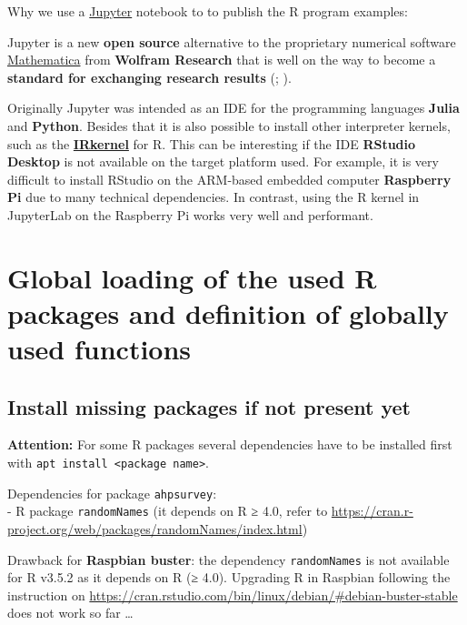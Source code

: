 \documentclass [oneside,10pt,a4paper,ngerman,BCOR10mm,headsepline,parindent,final]{scrartcl}
\begin{document}
Why we use a
\href{https://en.wikipedia.org/wiki/Project_Jupyter}{Jupyter} notebook
to to publish the R program examples:

Jupyter is a new \textbf{open source} alternative to the proprietary
numerical software
\href{https://en.wikipedia.org/wiki/Wolfram_Mathematica}{Mathematica}
from \textbf{Wolfram Research} that is well on the way to become a
\textbf{standard for exchanging research results}
(\cite{Scientific_Paper_obsolete_2018};
\cite{Future_of_Research_Paper_2018}).

Originally Jupyter was intended as an IDE for the programming languages
\textbf{Julia} and \textbf{Python}. Besides that it is also possible to
install other interpreter kernels, such as the
\textbf{\href{https://irkernel.github.io/installation/}{IRkernel}} for
R. This can be interesting if the IDE \textbf{RStudio Desktop} is not
available on the target platform used. For example, it is very difficult
to install RStudio on the ARM-based embedded computer \textbf{Raspberry
Pi} due to many technical dependencies. In contrast, using the R kernel
in JupyterLab on the Raspberry Pi works very well and performant.

    \hypertarget{global-loading-of-the-used-r-packages-and-definition-of-globally-used-functions}{%
\section{Global loading of the used R packages and definition of
globally used
functions}\label{global-loading-of-the-used-r-packages-and-definition-of-globally-used-functions}}

\hypertarget{install-missing-packages-if-not-present-yet}{%
\subsection{Install missing packages if not present
yet}\label{install-missing-packages-if-not-present-yet}}

\textbf{Attention:} For some R packages several dependencies have to be
installed first with
\texttt{apt\ install\ \textless{}package\ name\textgreater{}}.

Dependencies for package \texttt{ahpsurvey}:\\
- R package \texttt{randomNames} (it depends on R ≥ 4.0, refer to
\url{https://cran.r-project.org/web/packages/randomNames/index.html})

Drawback for \textbf{Raspbian buster}: the dependency
\texttt{randomNames} is not available for R v3.5.2 as it depends on R (≥
4.0). Upgrading R in Raspbian following the instruction on
\url{https://cran.rstudio.com/bin/linux/debian/\#debian-buster-stable}
does not work so far \ldots{}
\end{document}
